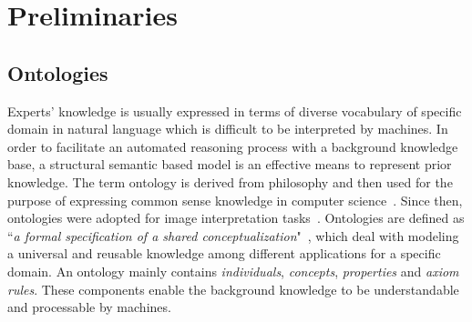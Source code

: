 \documentclass{article}
\begin{document}


% 
% 

\section{Preliminaries}\label{sec:pre}
\subsection{Ontologies}
Experts' knowledge is usually expressed in terms of diverse vocabulary of specific domain in natural language which is difficult to be interpreted by machines.
In order to facilitate an automated reasoning process with a background knowledge base, a structural semantic based model is  an effective means to represent prior knowledge.
The term ontology is derived from philosophy and then used for the purpose of expressing common sense knowledge in computer science~\cite{alexander1986knowledge}.
Since then, ontologies were adopted for image interpretation tasks~\cite{bannour2011towards,Hudelot2008fuzzy,town2006ontological}.
Ontologies are defined as “\textit{a formal specification of a shared conceptualization}"~\cite{studer1998knowledge},
which deal with modeling a universal and reusable knowledge among different applications for a specific domain.
An ontology mainly contains  \textit{individuals}, \textit{concepts}, \textit{properties} and \textit{axiom rules}. 
These components enable the background knowledge to be understandable and processable by machines.
\end{document}
